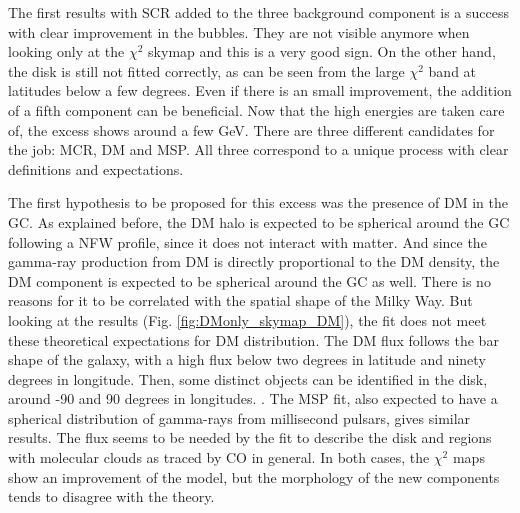 The first results with SCR added to the three background component is a success with clear improvement in the bubbles. They are not visible anymore when looking only at the $\chi^2$ skymap and this is a very good sign. On the other hand, the disk is still not fitted correctly, as can be seen from the large $\chi^2$ band at latitudes below a few degrees. Even if there is an small improvement, the addition of a fifth component can be beneficial.
Now that the high energies are taken care of, the excess shows around a few GeV. There are three different candidates for the job: MCR, DM and MSP. All three correspond to a unique process with clear definitions and expectations.



The first hypothesis to be proposed for this excess was the presence of DM in the GC. As explained before, the DM halo is expected to be spherical around the GC following a NFW profile, since it does not interact with matter. And since the gamma-ray production from DM is directly proportional to the DM density, the DM component is expected to be spherical around the GC as well. There is no reasons for it to be correlated with the spatial shape of the Milky Way. But looking at the results (Fig. \ref{fig:DMonly_skymap_DM}), the fit does not meet these theoretical expectations for DM distribution. The DM flux follows the bar shape of the galaxy, with a high flux below two degrees in latitude and ninety degrees in longitude. Then, some distinct objects can be identified in the disk, around -90 and 90 degrees in longitudes. .
The MSP fit, also expected to have a spherical distribution of gamma-rays from millisecond pulsars, gives similar results. The flux seems to be needed by the fit to describe the disk and regions with molecular clouds as traced by CO in general.
In both cases, the $\chi^2$ maps show an improvement of the model, but the morphology of the new components tends to disagree with the theory.




